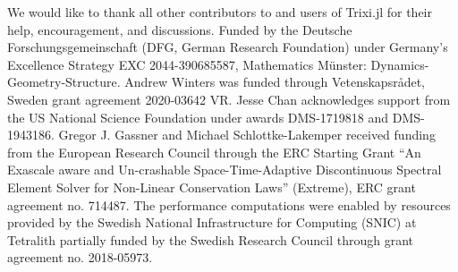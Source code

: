 \documentclass[hidelinks]{juliacon} %
\newcommand{\trixi}{Trixi.jl\xspace}
\begin{document}
We would like to thank all other contributors to and users of \trixi for their
help, encouragement, and discussions.
Funded by the Deutsche Forschungsgemeinschaft (DFG, German Research Foundation)
under Germany's Excellence Strategy EXC 2044-390685587, Mathematics Münster:
Dynamics-Geometry-Structure.
Andrew Winters was funded through Vetenskapsr{\aa}det, Sweden grant
agreement 2020-03642 VR.
Jesse Chan acknowledges support from the US National Science Foundation under
awards DMS-1719818 and DMS-1943186.
Gregor J. Gassner and Michael Schlottke-Lakemper received funding from the European Research Council through the ERC Starting Grant “An Exascale aware and Un-crashable Space-Time-Adaptive Discontinuous Spectral Element Solver for Non-Linear Conservation Laws” (Extreme), ERC grant agreement no. 714487.
The performance computations were enabled by resources provided by the Swedish National
Infrastructure for Computing (SNIC) at Tetralith partially funded by the Swedish
Research Council through grant agreement no. 2018-05973.



\end{document}
